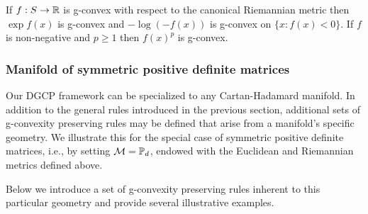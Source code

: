 \documentclass[twoside,11pt]{article}
\begin{document}
\begin{example}
    If $f:S \to \mathbb{R}$ is g-convex with respect to the canonical Riemannian metric then $\exp f(x)$ is g-convex and $- \log (-f(x))$ is g-convex on $\{x : f(x) < 0 \}$. If $f$ is non-negative and $p \geq 1$ then $f(x)^p$ is g-convex.
\end{example}



\subsubsection{Manifold of symmetric positive definite matrices}\label{sec:rules}

Our DGCP framework can be specialized to any Cartan-Hadamard manifold. In addition to the general rules introduced in the previous section, additional sets of g-convexity preserving rules may be defined that arise from a manifold's specific geometry. We illustrate this for the special case of symmetric positive definite matrices, i.e., by setting $\mathcal{M} = \mathbb{P}_d$, endowed with the Euclidean and Riemannian metrics defined above. 

Below we introduce a set of g-convexity preserving rules inherent to this particular geometry and provide several illustrative examples. 
\end{document}
